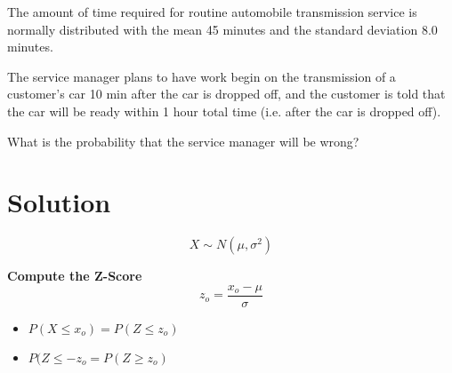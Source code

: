 \documentclass[a4paper,12pt]{article}
\begin{document}
\large

The amount of time required for routine automobile transmission service is normally distributed with the mean 45 minutes and the standard deviation 8.0 minutes. 
	
	The service manager plans to have work begin on the transmission of a customer’s car 10 min after the car is dropped off, and the customer is told that the car will be ready within 1 hour total time (i.e. after  the car is dropped off). 
	
	What is the probability that the service manager will be wrong?

\section*{Solution}
\[X \sim N(\mu,\sigma^2) \]
\begin{framed}
\noindent \textbf{Compute the Z-Score}
\[ z_{o} = \frac{ x_{o} - \mu}{\sigma} \]
\end{framed}
\begin{itemize}
    \item $P(X\leq x_{o}) = P(Z \leq z_{o})$
    \item $P(Z \leq -z_{o} = P(Z \geq z_{o})$
\end{itemize}
\end{document}
